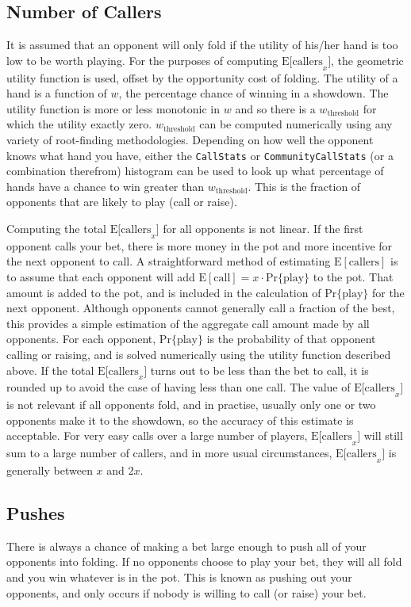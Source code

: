 \subsection{Number of Callers}
\label{sec:Callers}
It is assumed that an opponent will only fold if the utility of his/her hand is too low to be worth playing.
For the purposes of computing $\mathrm{E[callers}_x]$, the geometric utility function is used, offset by the opportunity cost of folding.
The utility of a hand is a function of $w$, the percentage chance of winning in a showdown.
The utility function is more or less monotonic in $w$ and so there is a $w_{\mathrm{threshold}}$ for which the utility exactly zero.
$w_{\mathrm{threshold}}$ can be computed numerically using any variety of root-finding methodologies.
Depending on how well the opponent knows what hand you have, either the \texttt{CallStats} or \texttt{CommunityCallStats} (or a combination therefrom) histogram can be used to look up what percentage of hands have a chance to win greater than $w_{\mathrm{threshold}}$.
This is the fraction of opponents that are likely to play (call or raise).


Computing the total $\mathrm{E[callers}_x]$ for all opponents is not linear.
If the first opponent calls your bet, there is more money in the pot and more incentive for the next opponent to call.
A straightforward method of estimating $\mathrm{E[callers]}$ is to assume that each opponent will add $\mathrm{E[call]} = x \cdot \mathrm{Pr\{play\}}$ to the pot.
That amount is added to the pot, and is included in the calculation of $\mathrm{Pr\{play\}}$ for the next opponent.
Although opponents cannot generally call a fraction of the best, this provides a simple estimation of the aggregate call amount made by all opponents.
For each opponent, $\mathrm{Pr\{play\}}$ is the probability of that opponent calling or raising, and is solved numerically using the utility function described above.
If the total $\mathrm{E[callers}_x]$ turns out to be less than the bet to call, it is rounded up to avoid the case of having less than one call.
The value of $\mathrm{E[callers}_x]$ is not relevant if all opponents fold, and in practise, usually only one or two opponents make it to the showdown, so the accuracy of this estimate is acceptable.
For very easy calls over a large number of players, $\mathrm{E[callers}_x]$ will still sum to a large number of callers, and in more usual circumstances, $\mathrm{E[callers}_x]$ is generally between $x$ and $2x$.


\subsection{Pushes}
\label{sec:Push}
There is always a chance of making a bet large enough to push all of your opponents into folding.
If no opponents choose to play your bet, they will all fold and you win whatever is in the pot.
This is known as pushing out your opponents, and only occurs if nobody is willing to call (or raise) your bet.

